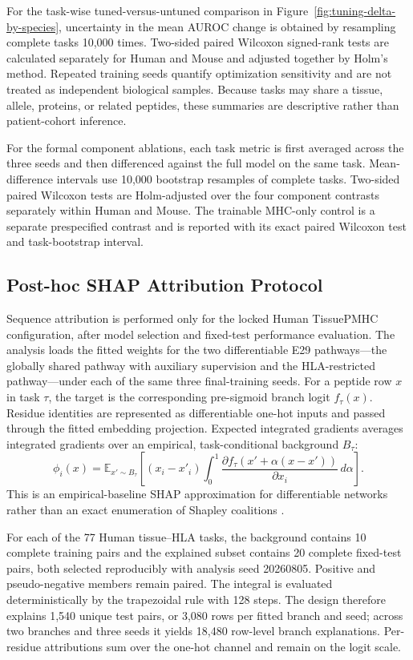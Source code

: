 For the task-wise tuned-versus-untuned comparison in Figure~\ref{fig:tuning-delta-by-species}, uncertainty in the mean AUROC change is obtained by resampling complete tasks 10,000 times. Two-sided paired Wilcoxon signed-rank tests are calculated separately for Human and Mouse and adjusted together by Holm's method. Repeated training seeds quantify optimization sensitivity and are not treated as independent biological samples. Because tasks may share a tissue, allele, proteins, or related peptides, these summaries are descriptive rather than patient-cohort inference.

For the formal component ablations, each task metric is first averaged across the three seeds and then differenced against the full model on the same task. Mean-difference intervals use 10,000 bootstrap resamples of complete tasks. Two-sided paired Wilcoxon tests are Holm-adjusted over the four component contrasts separately within Human and Mouse. The trainable MHC-only control is a separate prespecified contrast and is reported with its exact paired Wilcoxon test and task-bootstrap interval.

\subsection{Post-hoc SHAP Attribution Protocol}

Sequence attribution is performed only for the locked Human TissuePMHC configuration, after model selection and fixed-test performance evaluation. The analysis loads the fitted weights for the two differentiable E29 pathways---the globally shared pathway with auxiliary supervision and the HLA-restricted pathway---under each of the same three final-training seeds. For a peptide row \(x\) in task \(\tau\), the target is the corresponding pre-sigmoid branch logit \(f_{\tau}(x)\). Residue identities are represented as differentiable one-hot inputs and passed through the fitted embedding projection. Expected integrated gradients averages integrated gradients over an empirical, task-conditional background \(B_{\tau}\):
\[
\phi_i(x)=
\mathbb{E}_{x'\sim B_{\tau}}
\left[(x_i-x'_i)
\int_0^1
\frac{\partial f_{\tau}\!\left(x'+\alpha(x-x')\right)}{\partial x_i}
\,d\alpha\right].
\]
This is an empirical-baseline SHAP approximation for differentiable networks rather than an exact enumeration of Shapley coalitions \cite{lundberg2017shap,sundararajan2017integrated,erion2021expected}.

For each of the 77 Human tissue--HLA tasks, the background contains 10 complete training pairs and the explained subset contains 20 complete fixed-test pairs, both selected reproducibly with analysis seed 20260805. Positive and pseudo-negative members remain paired. The integral is evaluated deterministically by the trapezoidal rule with 128 steps. The design therefore explains 1,540 unique test pairs, or 3,080 rows per fitted branch and seed; across two branches and three seeds it yields 18,480 row-level branch explanations. Per-residue attributions sum over the one-hot channel and remain on the logit scale.

